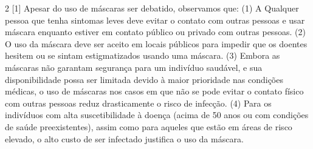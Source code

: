 \documentclass[onecolumn,journal]{IEEEtran}
\begin{document}
\begin{multicols}{2}
[1] Apesar do uso de máscaras ser debatido, observamos que: (1) A Qualquer pessoa que tenha sintomas leves deve evitar o contato com outras pessoas e usar máscara enquanto estiver em contato público ou privado com outras pessoas. (2) O uso da máscara deve ser aceito em locais públicos para impedir que os doentes hesitem ou se sintam estigmatizados usando uma máscara. (3) Embora as máscaras não garantam segurança para um indivíduo saudável, e sua disponibilidade possa ser limitada devido à maior prioridade nas condições médicas, o uso de máscaras nos casos em que não se pode evitar o contato físico com outras pessoas reduz drasticamente o risco de infecção. (4) Para os indivíduos com alta suscetibilidade à doença (acima de 50 anos ou com condições de saúde preexistentes), assim como para aqueles que estão em áreas de risco elevado, o alto custo de ser infectado justifica o uso da máscara.



\end{multicols}



% 
\end{document}

